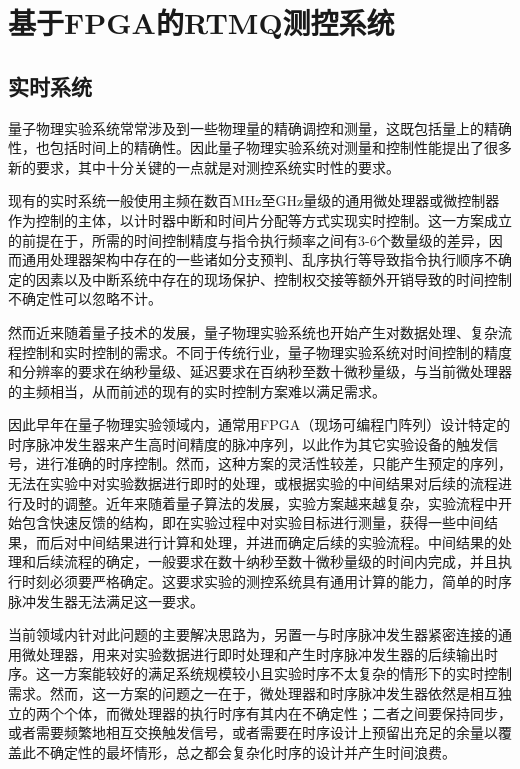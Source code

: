 
\chapter[基于FPGA的RTMQ测控系统]{基于FPGA的RTMQ测控系统\label{section:fpga_rtmq}}

\section[实时系统]{实时系统}

量子物理实验系统常常涉及到一些物理量的精确调控和测量，这既包括量上的精确性，也包括时间上的精确性。因此量子物理实验系统对测量和控制性能提出了很多新的要求，其中十分关键的一点就是对测控系统实时性的要求。

现有的实时系统一般使用主频在数百MHz至GHz量级的通用微处理器或微控制器作为控制的主体，以计时器中断和时间片分配等方式实现实时控制。这一方案成立的前提在于，所需的时间控制精度与指令执行频率之间有3-6个数量级的差异，因而通用处理器架构中存在的一些诸如分支预判、乱序执行等导致指令执行顺序不确定的因素以及中断系统中存在的现场保护、控制权交接等额外开销导致的时间控制不确定性可以忽略不计。

然而近来随着量子技术的发展，量子物理实验系统也开始产生对数据处理、复杂流程控制和实时控制的需求。不同于传统行业，量子物理实验系统对时间控制的精度和分辨率的要求在纳秒量级、延迟要求在百纳秒至数十微秒量级，与当前微处理器的主频相当，从而前述的现有的实时控制方案难以满足需求。

因此早年在量子物理实验领域内，通常用FPGA（现场可编程门阵列）设计特定的时序脉冲发生器来产生高时间精度的脉冲序列，以此作为其它实验设备的触发信号，进行准确的时序控制。然而，这种方案的灵活性较差，只能产生预定的序列，无法在实验中对实验数据进行即时的处理，或根据实验的中间结果对后续的流程进行及时的调整。近年来随着量子算法的发展，实验方案越来越复杂，实验流程中开始包含快速反馈的结构，即在实验过程中对实验目标进行测量，获得一些中间结果，而后对中间结果进行计算和处理，并进而确定后续的实验流程。中间结果的处理和后续流程的确定，一般要求在数十纳秒至数十微秒量级的时间内完成，并且执行时刻必须要严格确定。这要求实验的测控系统具有通用计算的能力，简单的时序脉冲发生器无法满足这一要求。

当前领域内针对此问题的主要解决思路为，另置一与时序脉冲发生器紧密连接的通用微处理器，用来对实验数据进行即时处理和产生时序脉冲发生器的后续输出时序。这一方案能较好的满足系统规模较小且实验时序不太复杂的情形下的实时控制需求。然而，这一方案的问题之一在于，微处理器和时序脉冲发生器依然是相互独立的两个个体，而微处理器的执行时序有其内在不确定性；二者之间要保持同步，或者需要频繁地相互交换触发信号，或者需要在时序设计上预留出充足的余量以覆盖此不确定性的最坏情形，总之都会复杂化时序的设计并产生时间浪费。


